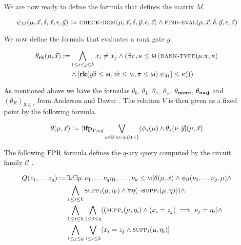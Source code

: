 \documentclass[../paper.tex]{subfiles}
\begin{document}
We are now ready to define the formula that defines the matrix $M$.
				
\begin{align*}
	\psi_M (\mu, \vec{x}, \delta, \vec{x}, \epsilon, \vec{y}) :=  \textsc{check-dom}(\mu, \vec{x}, \delta, \vec{y}, \epsilon, \vec{z}) \land \textsc{find-eval} (\mu, \vec{x}, \delta, \vec{y}, \epsilon, \vec{z}) 
\end{align*}
				
We now define the formula that evaluates a rank gate $g$.
				
\begin{align*}
	\theta_{\text{\textbf{rk}}} (\mu, \vec{x}) := & \bigwedge_{1 \leq i < j \leq k} x_i \neq x_j \land (\exists \pi, \kappa \leq \textsc{m} \, (\textsc{rank-type}(\mu. \pi, \kappa) \\ &\land [\text{\textbf{rk}} (\vec{y}\delta\leq \textsc{m}, \vec{z}\epsilon\leq \textsc{m}, \pi \leq \textsc{m}). \psi_M] \leq \kappa )))
\end{align*}
				
As mentioned above we have the formulas $\theta_0$, $\theta_1$, $\theta_\land$,
$\theta_\lor$, $\theta_{\text{\textbf{nand}}}$, $\theta_{\text{\textbf{maj}}}$ and $(\theta_R)_{R \in \tau}$ from
Anderson and Dawar \cite{AndersonD17}. The relation $V$ is then given as a fixed
point by the following formula.

\begin{align*}
	\theta (\mu, \vec{x}) := [\text{\textbf{ifp}}_{V,\nu \vec{y}} \bigvee_{s \in \mathbb{B}' \uplus \tau \uplus \{0,1\}} (\phi_s(\mu) \land \theta_s (\nu, \vec{y} ] (\mu, \vec{x}) 
\end{align*}

The following $\text{\upshape FPR}$ formula defines the $q$-ary query computed by the circuit
family $\mathcal{C}$ \cite{AndersonD17}.
				
\begin{align*}
	Q (z_1, \ldots z_q) := & \exists \vec{x} \exists \mu, \nu_1 , \ldots  \nu_q \eta_1 , \ldots , \nu_k \leq \textsc{m} [\theta (\mu, \vec{x}) \land \phi_\Omega (\nu_1, \ldots \nu_q, \mu) \land \\
                         & \bigwedge_{1 \leq i \leq k} \textsc{supp}_i (\mu, \eta_i) \wedge \forall \eta (\neg \textsc{supp}_i (\mu, \eta))) \land \\
                         & \bigwedge_{1 \leq i \leq k} \bigwedge_{1 \leq j \leq q}((\textsc{supp}_i (\mu, \eta_i) \land (x_i = z_j) \implies \nu_j = \eta_i) \land \\ &
                                                                                                                                                                    \bigwedge_{1 \leq j \leq q} \bigvee_{1 \leq i \leq k} (x_i = z_j \land \textsc{supp}_i (\mu, \eta_i)]
\end{align*}
				
\end{document}
